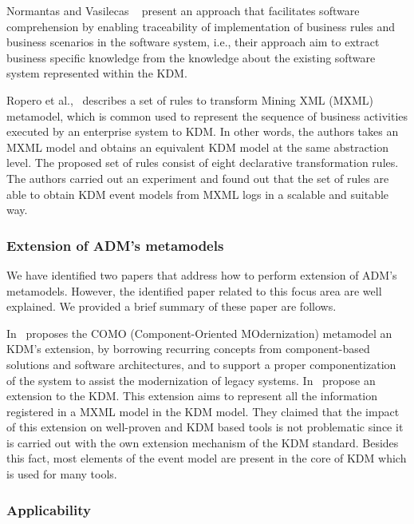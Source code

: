 Normantas and Vasilecas ~\cite{lastDAyOFMyLife} present an approach that facilitates software comprehension by enabling traceability of implementation of business rules and business scenarios in the software system, i.e., their approach aim to extract business specific knowledge from the knowledge about the existing software system represented within the KDM.

Ropero et al.,~\cite{Fernandez-Ropero:2012:EAB:2367051.2367064} describes a set of rules to transform Mining XML (MXML) metamodel, which is common used to represent the sequence of business activities executed by an enterprise system to KDM. In other words, the authors takes an MXML model and obtains an equivalent KDM model at the same abstraction level. The proposed set of rules consist of eight declarative transformation rules. The authors carried out an experiment and found out that the set of rules are able to obtain KDM event models from MXML logs in a scalable and suitable way.


\subsubsection{Extension of ADM's metamodels} %
\label{ssub:extension_of_adm_s_metamodels}

We have identified two papers that address how to perform extension of ADM's metamodels. However, the identified paper related to this focus area are well explained. We provided a brief summary of these paper are follows. 

In~\cite{5773392} proposes the COMO (Component-Oriented MOdernization) metamodel an KDM's extension, by borrowing recurring concepts from component-based solutions and software architectures, and to support a proper componentization of the system to assist the modernization of legacy systems. In~\cite{Perez-Castillo:2012:IEL:2231936.2231949} propose an extension to the KDM. This extension aims to represent all the information registered in a MXML model in the KDM model. They claimed that the impact of this extension on well-proven and KDM based tools is not problematic since it is carried out with the own extension mechanism of the KDM standard. Besides this fact, most elements of the event model are present in the core of KDM which is used for many tools.


\subsubsection{Applicability} %
\label{ssub:applicability}

